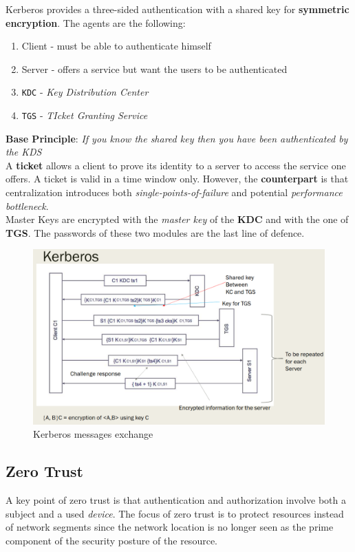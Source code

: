 Kerberos provides a three-sided authentication with a shared key for \textbf{symmetric encryption}.
The agents are the following:
\begin{enumerate}
    \item Client - must be able to authenticate himself
    \item Server - offers a service but want the users to be authenticated
    \item \texttt{KDC} - \textit{Key Distribution Center}
    \item \texttt{TGS} - \textit{TIcket Granting Service}
\end{enumerate}
\textbf{Base Principle}: \textit{If you know the shared key then you have been authenticated by the KDS}\\
A \textbf{ticket} allows a client to prove its identity to a server to access the service one offers. 
A ticket is valid in a time window only.\textit{}
However, the \textbf{counterpart }is that centralization introduces both \textit{single-points-of-failure} and potential \textit{performance bottleneck}.\\
Master Keys are encrypted with the \textit{master key} of the \textbf{KDC} and with the one of \textbf{TGS}. The passwords of these two modules are the last line of defence.
\begin{figure}
    \centering
    \includegraphics{images/kerberos_messages.png}
    \caption{Kerberos messages exchange}
    \label{fig:kerberos_messages}
\end{figure}

\subsection{Zero Trust}
A key point of zero trust is that authentication and authorization involve both a subject and a used \textit{device}.
The focus of zero trust is to protect resources instead of network segments since the network
location is no longer seen as the prime component of the security posture of the resource.

